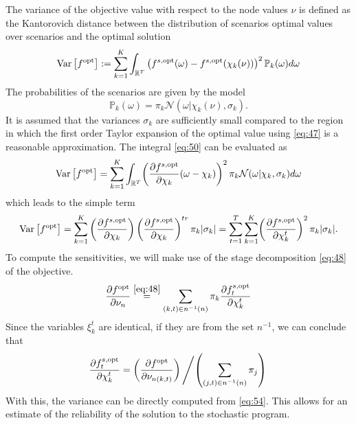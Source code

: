 The variance of the objective value with respect to the node values $\nu$ is defined as the Kantorovich distance between the distribution of scenarios optimal values over scenarios and the optimal solution
\begin{equation}
  \label{eq:50}
  \mathrm{Var}\left[f^{\mathrm{opt}}\right] :=  \sum_{k=1}^K\int_{\mathbb{R}^T} \left(f^{s,\mathrm{opt}}(\omega)-f^{s,\mathrm{opt}}\mathopen{}\left(\chi_k(\nu)\right)\right)^2\mathbb{P}_k(\omega)d\omega
\end{equation}
The probabilities of the scenarios are given by the model
\begin{equation}
  \label{eq:55}
  \mathbb{P}_k(\omega) = \pi_k\mathcal{N}(\omega|\chi_{k}(\nu),\sigma_k).
\end{equation}
It is assumed that the variances $\sigma_k$ are sufficiently small compared to the region in which the first order Taylor expansion of the optimal value using \eqref{eq:47} is a reasonable approximation.
The integral \eqref{eq:50} can be evaluated as
\begin{equation}
  \label{eq:52}
  \operatorname{Var}\left[f^{\mathrm{opt}}\right] = \sum_{k=1}^K\int_{\mathbb{R}^T} \mathopen{}\left(\frac{\partial f^{s,\mathrm{opt}}}{\partial \chi_k}(\omega-\chi_k)\right)^2\pi_k\mathcal{N}(\omega|\chi_k,\sigma_k)d\omega
\end{equation}
which leads to the simple term
\begin{equation}
  \label{eq:54}
  \operatorname{Var}\left[f^{\mathrm{opt}}\right] = \sum_{k=1}^K \left(\frac{\partial f^{s,\mathrm{opt}}}{\partial\chi_k} \right)\left(\frac{\partial f^{s,\mathrm{opt}}}{\partial\chi_k} \right)^{tr}\pi_k|\sigma_k| = \sum_{t=1}^T\sum_{k=1}^K\mathopen{}\left(\frac{\partial f^{s,\mathrm{opt}}}{\partial \chi_{k}^t}\right)^2 \pi_k|\sigma_k|.
\end{equation}
To compute the sensitivities, we will make use of the stage decomposition \eqref{eq:48} of the objective.
\begin{equation}
  \label{eq:51}
  \frac{\partial f^{\mathrm{opt}}}{\partial \nu_n} \overset{\eqref{eq:48}}{=} \sum_{(k,t)\in n^{-1}(n)}\pi_k\frac{\partial f_{t}^{s,\mathrm{opt}}}{\partial \chi_{k}^t}
\end{equation}
Since the variables $\xi_{k}^t$ are identical, if they are from the set $n^{-1}$, we can conclude that
\begin{equation}
  \label{eq:56}
  \frac{\partial f_t^{s,\mathrm{opt}}}{\partial \chi_{k}^t} = \left(\frac{\partial f^{\mathrm{opt}}}{\partial \nu_{n(k,t)}}\right) \left/ \left(\sum_{(j,t)\in n^{-1}(n)} \pi_j\right)\right.
\end{equation}
With this, the variance can be directly computed from \eqref{eq:54}.
This allows for an estimate of the reliability of the solution to the stochastic program.
